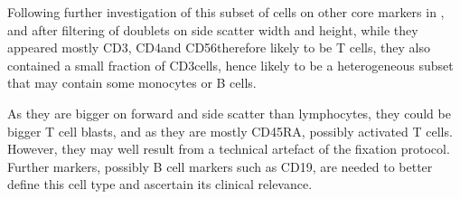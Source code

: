 Following further investigation of this subset of cells on other core markers in , and after filtering of doublets on side scatter width and height, while they appeared mostly CD3\positive, CD4\positive and CD56\negative therefore likely to be T cells, they also contained a small fraction of CD3\negative cells, hence likely to be a heterogeneous subset that may contain some monocytes or B cells.

As they are bigger on forward and side scatter than lymphocytes, they could be bigger T cell blasts, and as they are mostly CD45RA\positive,
possibly activated T cells.
However, they may well result from a technical artefact of the fixation protocol.
Further markers, possibly B cell markers such as CD19, are needed to better define this cell type and ascertain its clinical relevance.

